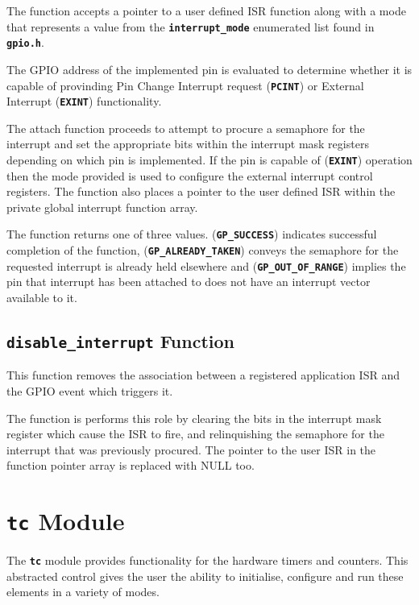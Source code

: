 \documentclass[a4paper, oneside, 11pt, titlepage, onecolumn, openright]{report}
\begin{document}
			The function accepts a pointer to a user defined ISR function along with a mode that represents a value from the \textbf{\texttt{interrupt\_mode}} enumerated list found in \textbf{\texttt{gpio.h}}. 
			
			The GPIO address of the implemented pin is evaluated to determine whether it is capable of provinding Pin Change Interrupt request (\textbf{\texttt{PCINT}}) or External Interrupt (\textbf{\texttt{EXINT}}) functionality.
			
			The attach function proceeds to attempt to procure a semaphore for the interrupt and set the appropriate bits within the interrupt mask registers depending on which pin is implemented. If the pin is capable of (\textbf{\texttt{EXINT}}) operation then the mode provided is used to configure the external interrupt control registers. The function also places a pointer to the user defined ISR within the private global interrupt function array.
			
			The function returns one of three values. (\textbf{\texttt{GP\_SUCCESS}}) indicates successful completion of the function, (\textbf{\texttt{GP\_ALREADY\_TAKEN}}) conveys the semaphore for the requested interrupt is already held elsewhere and (\textbf{\texttt{GP\_OUT\_OF\_RANGE}}) implies the pin that interrupt has been attached to does not have an interrupt vector available to it.
			
\subsection{\textbf{\texttt{disable\_interrupt}} Function}
			\label{ss:HALdisable_interruptFunction}
			
			This function removes the association between a registered application ISR and the GPIO event which triggers it. 
			
			The function is performs this role by clearing the bits in the interrupt mask register which cause the ISR to fire, and relinquishing the semaphore for the interrupt that was previously procured. The pointer to the user ISR in the function pointer array is replaced with NULL too.
			
\section{\textbf{\texttt{tc}} Module}
			\label{s:HALtcModule}
			The \textbf{\texttt{tc}} module provides functionality for the hardware timers and counters. This abstracted control gives the user the ability to initialise, configure and run these elements in a variety of modes.
			
\end{document}
